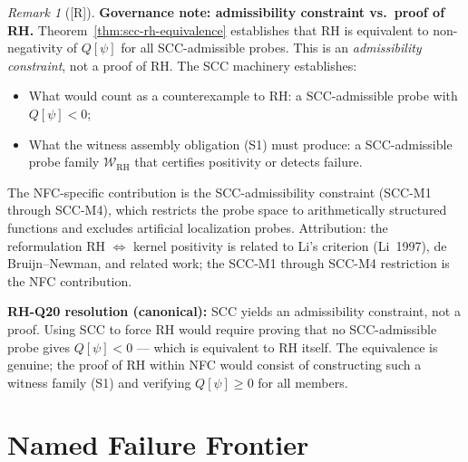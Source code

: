 \documentclass[12pt,oneside]{amsbook}
\theoremstyle{plain}
\theoremstyle{definition}
\theoremstyle{remark}
\newtheorem{remark}[theorem]{Remark}
\newcommand{\status}[1]{\textup{[#1]}}
\begin{document}
\begin{remark}[\status{R}]\label{rem:scc-rh-governance}
\textbf{Governance note: admissibility constraint vs.\ proof of RH.}
Theorem~\ref{thm:scc-rh-equivalence} establishes that RH is
equivalent to non-negativity of $Q[\psi]$ for all SCC-admissible
probes. This is an \emph{admissibility constraint}, not a
proof of RH. The SCC machinery establishes:
\begin{itemize}
 \item What would count as a counterexample to RH: a
 SCC-admissible probe with $Q[\psi] < 0$;
 \item What the witness assembly obligation (S1) must produce:
 a SCC-admissible probe family $\mathcal{W}_{\mathrm{RH}}$
 that certifies positivity or detects failure.
\end{itemize}
The NFC-specific contribution is the SCC-admissibility constraint
(SCC-M1 through SCC-M4), which restricts the probe space to
arithmetically structured functions and excludes artificial
localization probes. Attribution: the reformulation RH
$\Leftrightarrow$ kernel positivity is related to Li's criterion
(Li~1997), de Bruijn--Newman, and related work; the SCC-M1
through SCC-M4 restriction is the NFC contribution.

\textbf{RH-Q20 resolution (canonical):} SCC yields an
admissibility constraint, not a proof. Using SCC to force
RH would require proving that no SCC-admissible probe gives
$Q[\psi] < 0$ --- which is equivalent to RH itself.
The equivalence is genuine; the proof of RH within NFC would
consist of constructing such a witness family (S1) and
verifying $Q[\psi] \geq 0$ for all members.
\end{remark}

\section{Named Failure Frontier}
\label{sec:frontier}
\end{document}
